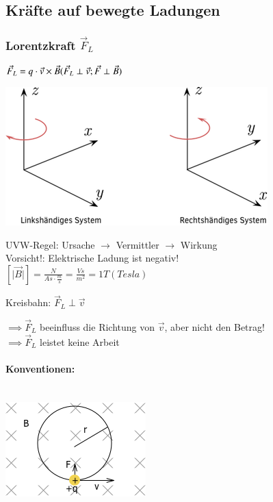   \subsection{ Kräfte auf bewegte Ladungen }  
    \subsubsection{ Lorentzkraft $\vec{F}_L$ }
    $\vec{F}_L = q\cdot\vec{v}\times\vec{B}\\ (\vec{F}_L \perp \vec{v}; \vec{F}\perp \vec{B} ) $\\
    
    \begin{center}
		\includegraphics[width=0.7\linewidth]{skizzen/16/16_1B01}
	\end{center}
    
    UVW-Regel: Ursache $\rightarrow$ Vermittler $\rightarrow$ Wirkung\\
    Vorsicht!: Elektrische Ladung ist negativ!\\
    
    $[\vert\vec{B}\vert]=\frac{N}{As\cdot\frac{m}{s}}=\frac{Vs}{m^2}=1T (Tesla)$
    
    Kreisbahn: $\vec{F}_L\perp \vec{v}$
    
    $\implies \vec{F}_L$ beeinfluss die Richtung von $\vec{v}$, aber nicht den Betrag!\\
    $\implies \vec{F}_L$ leistet keine Arbeit
    
      \paragraph{Konventionen:}\leavevmode \\
      
      \includegraphics[width=0.4\linewidth]{skizzen/16/16_1B02}\\
      
